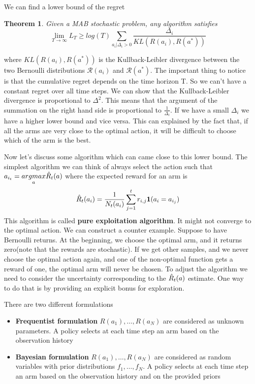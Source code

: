 \documentclass[main.tex]{subfiles}
\newtheorem{theorem}{Theorem}[section]
\begin{document}
We can find a lower bound of the regret
\begin{theorem}
Given a MAB stochastic problem, any algorithm satisfies
\begin{equation}
    \lim_{T \rightarrow \infty} L_T \geq log(T) \sum_{a_i|\Delta_i>0} \frac{\Delta_i}{KL(R(a_i),R(a^*))}
\end{equation}
\end{theorem}
\par \noindent
where $KL(R(a_i),R(a^*))$ is the Kullback-Leibler divergence between the two Bernoulli distributions $\mathcal{R}(a_i)$ and $\mathcal{R}(a^*)$. The important thing to notice is that the cumulative regret depends on the time horizon T. So we can't have a constant regret over all time steps. We can show that the Kullback-Leibler divergence is proportional to $\Delta^2$. This means that the argument of the summation on the right hand side is proportional to $\frac{1}{\Delta_i}$. If we have a small $\Delta_i$ we have a higher lower bound and vice versa. This can explained by the fact that, if all the arms are very close to the optimal action, it will be difficult to choose which of the arm is the best.

Now let's discuss some algorithm which can came close to this lower bound. The simplest algorithm we can think of always select the action such that $a_{i_t} = \underset{a}{argmax} \Hat{R}_t(a)$ where the expected
reward for an arm is
\begin{equation*}
    \Hat{R}_t(a_i) = \frac{1}{N_t(a_i)} \sum_{j=1}^t r_{i,j} \mathbf{1}(a_i = a_{i_j})
\end{equation*}
This algorithm is called \textbf{pure exploitation algorithm}. It might not converge to the optimal action. We can construct a counter example. Suppose to have Bernoulli returns. At the beginning, we choose the optimal arm, and it returns zero(note that the rewards are stochastic). If we get other samples, and we never choose the optimal action again, and one of the non-optimal function gets a reward of one, the optimal arm will never be chosen.
To adjust the algorithm we need to consider the uncertainty corresponding to the $\Hat{R}_t(a)$ estimate. One way to do that is by providing an explicit bonus for exploration.

There are two different formulations
\begin{itemize}
    \item \textbf{Frequentist formulation} $R(a_1), \dots, R(a_N)$ are considered as unknown parameters. A policy selects at each time step an arm based on the observation history
    \item \textbf{Bayesian formulation} $R(a_1), \dots, R(a_N)$ are considered as random variables with prior distributions $f_1,\dots,f_N$. A policy selects at each time step an arm based on the observation history and on the provided priors
\end{itemize}
\end{document}
